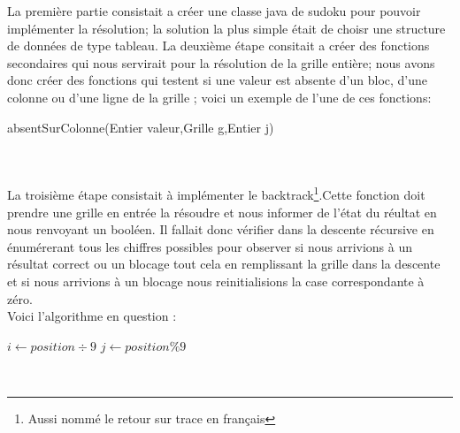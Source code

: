 \documentclass{article}
\begin{document}
La première partie consistait a créer une classe java de sudoku pour pouvoir implémenter la résolution; la solution la plus simple était de choisr une structure de données de type tableau.
\newline
\newline La deuxième étape consitait a créer des fonctions secondaires qui nous servirait pour la résolution de la grille entière; nous avons donc créer des fonctions qui testent si une valeur est absente d'un bloc, d'une colonne ou d'une ligne de la grille ; voici un exemple de l'une de ces fonctions:\\


\begin{algorithm}[H]
\SetAlgoLined
{}
\caption{absentSurColonne(Entier valeur,Grille g,Entier j)}
\end{algorithm}\\\\


La troisième étape consistait à implémenter le backtrack\footnote{Aussi nommé le retour sur trace en français}.Cette fonction doit prendre une grille en entrée la résoudre et nous informer de l'état du réultat en nous renvoyant un booléen.
Il fallait donc vérifier dans la descente récursive en énumérerant tous les chiffres possibles pour observer si nous arrivions à un résultat correct ou un blocage tout cela en remplissant la grille dans la descente et si nous arrivions à un blocage nous reinitialisions la case correspondante à zéro.\\
Voici l'algorithme en question :


\begin{algorithm}[H]
\SetAlgoLined
{}
$i \longleftarrow position \div 9  $
$j \longleftarrow position \% 9$\\
\end{algorithm}\\
\end{document}
